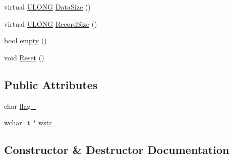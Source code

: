 \begin{DoxyCompactItemize}
\item 
virtual \hyperlink{_basic_excel_8hpp_abe09d1bea023be6a07cbadde8e955435}{U\+L\+O\+N\+G} \hyperlink{struct_y_excel_1_1_worksheet_1_1_cell_table_1_1_row_block_1_1_cell_block_1_1_formula_1_1_string_a8d8b7b8f66d95d15d21ac0299c48a974}{Data\+Size} ()
\item 
virtual \hyperlink{_basic_excel_8hpp_abe09d1bea023be6a07cbadde8e955435}{U\+L\+O\+N\+G} \hyperlink{struct_y_excel_1_1_worksheet_1_1_cell_table_1_1_row_block_1_1_cell_block_1_1_formula_1_1_string_aed8dcc7fdae02391f90d0401d633f455}{Record\+Size} ()
\item 
bool \hyperlink{struct_y_excel_1_1_worksheet_1_1_cell_table_1_1_row_block_1_1_cell_block_1_1_formula_1_1_string_aae18ab22d2b9ea78e8d768a31fe0cd1e}{empty} ()
\item 
void \hyperlink{struct_y_excel_1_1_worksheet_1_1_cell_table_1_1_row_block_1_1_cell_block_1_1_formula_1_1_string_a6c61d42b4b7cb343fd134c4540ad3b80}{Reset} ()
\end{DoxyCompactItemize}
\subsection*{Public Attributes}
\begin{DoxyCompactItemize}
\item 
char \hyperlink{struct_y_excel_1_1_worksheet_1_1_cell_table_1_1_row_block_1_1_cell_block_1_1_formula_1_1_string_ae95881d5021565f9b7ee07035039e88e}{flag\+\_\+}
\item 
wchar\+\_\+t $\ast$ \hyperlink{struct_y_excel_1_1_worksheet_1_1_cell_table_1_1_row_block_1_1_cell_block_1_1_formula_1_1_string_a9f77f390496c5b4248f261ef541f56cd}{wstr\+\_\+}
\end{DoxyCompactItemize}


\subsection{Constructor \& Destructor Documentation}
\hypertarget{struct_y_excel_1_1_worksheet_1_1_cell_table_1_1_row_block_1_1_cell_block_1_1_formula_1_1_string_ad835006c653c43d87b6eb9ee8e8264ef}{}
